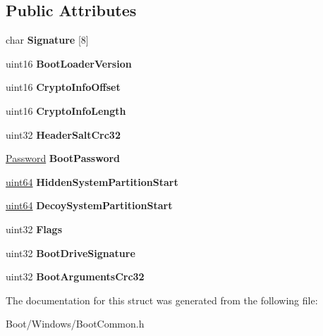 \subsection*{Public Attributes}
\begin{DoxyCompactItemize}
\item 
\mbox{\label{struct_boot_arguments_aca19ae4084ca61fcce111145395b689c}} 
char {\bfseries Signature} \mbox{[}8\mbox{]}
\item 
\mbox{\label{struct_boot_arguments_a4e190a5dc4261e64e0d462bdab7d20e7}} 
uint16 {\bfseries Boot\+Loader\+Version}
\item 
\mbox{\label{struct_boot_arguments_aea2951fbe84b252e1a1971bf4a9b9e57}} 
uint16 {\bfseries Crypto\+Info\+Offset}
\item 
\mbox{\label{struct_boot_arguments_a5acf3f8f32622bdcd600ccfc296abba1}} 
uint16 {\bfseries Crypto\+Info\+Length}
\item 
\mbox{\label{struct_boot_arguments_a80a4536c4ccbea70c754a263e5d55fd7}} 
uint32 {\bfseries Header\+Salt\+Crc32}
\item 
\mbox{\label{struct_boot_arguments_a18a224e594ee822f766c906a1ef05090}} 
\hyperlink{struct_password}{Password} {\bfseries Boot\+Password}
\item 
\mbox{\label{struct_boot_arguments_ae614b68ffded8553c64b70b59e0d3f80}} 
\hyperlink{union_u_i_n_t64___s_t_r_u_c_t}{uint64} {\bfseries Hidden\+System\+Partition\+Start}
\item 
\mbox{\label{struct_boot_arguments_a74d4f9d1128446c5a579181872e87954}} 
\hyperlink{union_u_i_n_t64___s_t_r_u_c_t}{uint64} {\bfseries Decoy\+System\+Partition\+Start}
\item 
\mbox{\label{struct_boot_arguments_acedf84d04bff2e43b7a8db64fb6d15dc}} 
uint32 {\bfseries Flags}
\item 
\mbox{\label{struct_boot_arguments_af55fd5dedcb006297b924e430eb3b134}} 
uint32 {\bfseries Boot\+Drive\+Signature}
\item 
\mbox{\label{struct_boot_arguments_a02a0daed393d25fcf864a4dd9ab69814}} 
uint32 {\bfseries Boot\+Arguments\+Crc32}
\end{DoxyCompactItemize}


The documentation for this struct was generated from the following file\+:\begin{DoxyCompactItemize}
\item 
Boot/\+Windows/Boot\+Common.\+h\end{DoxyCompactItemize}
